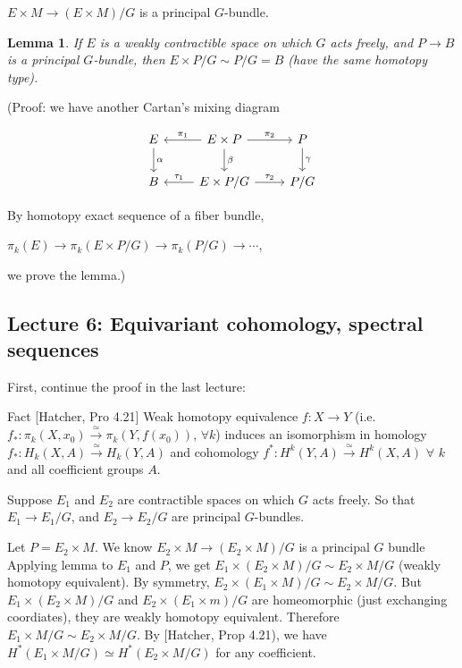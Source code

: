 \documentclass{article}
\theoremstyle{mystyle}
\newtheorem*{lemma*}{Lemma}
\theoremstyle{remark}
\numberwithin{equation}{section}
\begin{document}
$E\times M\rightarrow (E\times M)/G$ is a principal $G$-bundle.

\begin{lemma*} If $E$ is a weakly contractible space on which $G$ acts freely, and $P\rightarrow B$ is a principal $G$-bundle, then $E\times P/G \sim P/G = B$ (have the same homotopy type). 
\end{lemma*}

(Proof: we have another Cartan's mixing diagram

\begin{equation}\label{Cartan_mixing_diagram1}
\begin{tikzcd}
E  \ar[d,"\alpha"] & \ar[l,"\pi_1"']E\times P \ar[r,"\pi_2"]\ar[d,"\beta"] & P \ar[d,"\gamma"]\\
B & \ar[l,"\tau_1"']E \times P /G \ar[r,"\tau_2 "] & P/G 
\end{tikzcd}
\end{equation}

By homotopy exact sequence of a fiber bundle,

$\pi_k(E)\rightarrow \pi_k(E\times P/G) \rightarrow \pi_k(P/G)\rightarrow \cdots$, 

we prove the lemma.)


\subsection{Lecture 6: Equivariant cohomology, spectral sequences}



First, continue the proof in the last lecture: 

Fact [Hatcher, Pro 4.21] Weak homotopy equivalence $f\colon X\rightarrow Y$ (i.e. $f_*\colon \pi_k(X,x_0)\xrightarrow{\simeq} \pi_k(Y,f(x_0))$, $\forall k$) induces an isomorphism in homology $f_*\colon H_k(X,A)\xrightarrow{\simeq} H_k(Y,A)$ and cohomology $f^*\colon H^k(Y,A)\xrightarrow{\simeq } H^k(X,A)$ $\forall$ $k$ and all coefficient groups $A$.

Suppose $E_1$ and $E_2$ are contractible spaces on which $G$ acts freely. So that $E_1\rightarrow E_1/G$, and $E_2\rightarrow E_2/G$ are principal $G$-bundles.

Let $P = E_2 \times M$. We know $E_2\times M\rightarrow (E_2\times M)/G$ is a principal $G$ bundle Applying lemma to $E_1$ and $P$, we get $E_1\times (E_2\times M)/G \sim E_2\times M/G$ (weakly homotopy equivalent). By symmetry, $E_2\times (E_1\times M)/G \sim E_2\times M/G$. But $E_1\times (E_2\times M)/G$ and $E_2\times (E_1\times m)/G$ are homeomorphic (just exchanging coordiates), they are weakly homotopy equivalent. Therefore $E_1\times M/G \sim E_2\times M/G$. By [Hatcher, Prop 4.21), we have $H^*(E_1\times M/G) \simeq  H^*(E_2\times M/G)$ for any coefficient.  
\end{document}
